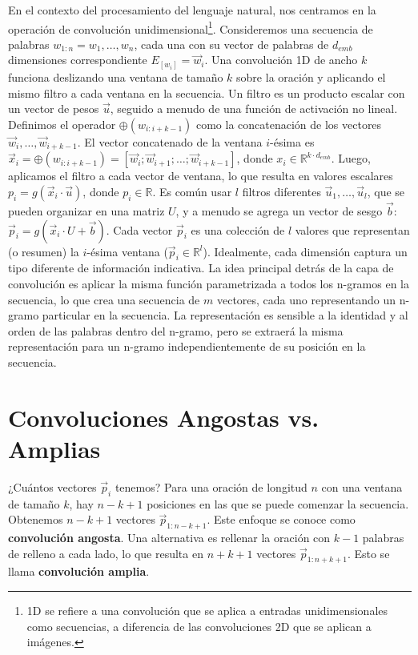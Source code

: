 En el contexto del procesamiento del lenguaje natural, nos centramos en la operación de convolución unidimensional\footnote{1D se refiere a una convolución que se aplica a entradas unidimensionales como secuencias, a diferencia de las convoluciones 2D que se aplican a imágenes.}. Consideremos una secuencia de palabras $w_{1:n} = w_1, \dots, w_n$, cada una con su vector de palabras de $d_{emb}$ dimensiones correspondiente $E_{[w_i]} = \vec{w}_{i}$. Una convolución 1D de ancho $k$ funciona deslizando una ventana de tamaño $k$ sobre la oración y aplicando el mismo filtro a cada ventana en la secuencia. Un filtro es un producto escalar con un vector de pesos $\vec{u}$, seguido a menudo de una función de activación no lineal. Definimos el operador $\oplus (w_{i:i+k-1})$ como la concatenación de los vectores $\vec{w}_{i}, \dots, \vec{w}_{i+k-1}$. El vector concatenado de la ventana $i$-ésima es $\vec{x}_{i} = \oplus (w_{i:i+k-1}) = [\vec{w}_{i};\vec{w}_{i+1};\dots;\vec{w}_{i+k-1}]$, donde $x_{i} \in \mathbb{R}^{k \cdot d_{emb}}$. Luego, aplicamos el filtro a cada vector de ventana, lo que resulta en valores escalares $p_{i} = g(\vec{x}_{i} \cdot \vec{u})$, donde $p_{i} \in \mathbb{R}$. Es común usar $l$ filtros diferentes $\vec{u}_1, \dots, \vec{u}_l$, que se pueden organizar en una matriz $U$, y a menudo se agrega un vector de sesgo $\vec{b}$: $\vec{p}_{i} = g(\vec{x}_{i} \cdot U + \vec{b})$. Cada vector $\vec{p}_i$ es una colección de $l$ valores que representan (o resumen) la $i$-ésima ventana ($\vec{p}_{i} \in \mathbb{R}^l$). Idealmente, cada dimensión captura un tipo diferente de información indicativa. La idea principal detrás de la capa de convolución es aplicar la misma función parametrizada a todos los n-gramos en la secuencia, lo que crea una secuencia de $m$ vectores, cada uno representando un n-gramo particular en la secuencia. La representación es sensible a la identidad y al orden de las palabras dentro del n-gramo, pero se extraerá la misma representación para un n-gramo independientemente de su posición en la secuencia.

\section{Convoluciones Angostas vs. Amplias}

¿Cuántos vectores $\vec{p}_i$ tenemos? Para una oración de longitud $n$ con una ventana de tamaño $k$, hay $n - k + 1$ posiciones en las que se puede comenzar la secuencia. Obtenemos $n - k + 1$ vectores $\vec{p}_{1:n-k+1}$. Este enfoque se conoce como \textbf{convolución angosta}. Una alternativa es rellenar la oración con $k - 1$ palabras de relleno a cada lado, lo que resulta en $n + k + 1$ vectores $\vec{p}_{1:n+k+1}$. Esto se llama \textbf{convolución amplia}.

